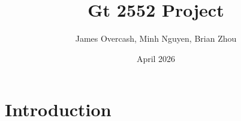 \documentclass{article}
\title{Gt 2552 Project}
\author{James Overcash, Minh Nguyen, Brian Zhou}
\date{April 2026}
\begin{document}
\maketitle

\section{Introduction}
\end{document}
